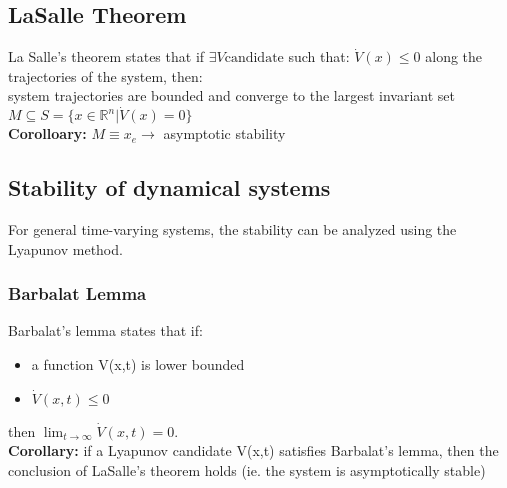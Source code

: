 \documentclass[a4paper,12pt]{article}
\begin{document}
\subsection{LaSalle Theorem}\label{sec:LaSalle Theorem}
La Salle's theorem states that if $\exists V \text{candidate}$ such 
that: $\dot{V}(x) \leq 0$ along the trajectories of the system, then:\\
system trajectories are bounded and converge to the largest invariant
set \\$M \subseteq S = \{x \in \mathbb{R}^n | \dot{V}(x) = 0\}$\\
\textbf{Corolloary:} $M \equiv {x_e} \rightarrow$ asymptotic stability

\subsection{Stability of dynamical systems}
For general time-varying systems, the stability can be analyzed using the Lyapunov method.
\subsubsection{Barbalat Lemma}
Barbalat's lemma states that if:
\begin{itemize}
    \item a function V(x,t) is lower bounded
    \item $\dot{V}(x,t) \leq 0$ 
\end{itemize}
then $\lim_{t \to \infty} \dot{V}(x,t) = 0$.\\
\textbf{Corollary:} if a Lyapunov candidate V(x,t) 
satisfies Barbalat's lemma, then the conclusion of 
LaSalle's theorem holds (ie. the system is asymptotically stable)
\end{document}

